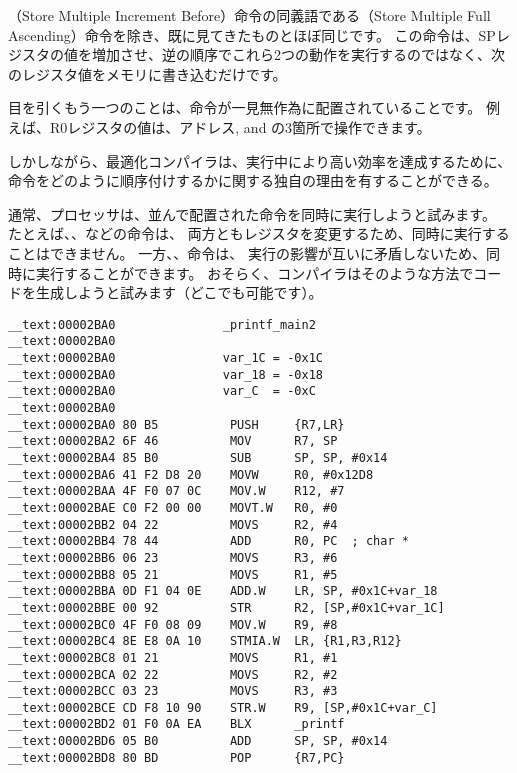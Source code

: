 （Store Multiple Increment Before）命令の同義語である（Store Multiple Full Ascending）命令を除き、既に見てきたものとほぼ同じです。
この命令は、\ac{SP}レジスタの値を増加させ、逆の順序でこれら2つの動作を実行するのではなく、次のレジスタ値をメモリに書き込むだけです。

目を引くもう一つのことは、命令が一見無作為に配置されていることです。
例えば、R0レジスタの値は、アドレス,  and の3箇所で操作できます。

しかしながら、最適化コンパイラは、実行中により高い効率を達成するために、命令をどのように順序付けするかに関する独自の理由を有することができる。

通常、プロセッサは、並んで配置された命令を同時に実行しようと試みます。
たとえば、、などの命令は、
両方ともレジスタを変更するため、同時に実行することはできません。
一方、、命令は、
実行の影響が互いに矛盾しないため、同時に実行することができます。
おそらく、コンパイラはそのような方法でコードを生成しようと試みます（どこでも可能です）。

\myparagraph{\OptimizingXcodeIV: \ThumbTwoMode}

\begin{lstlisting}[style=customasmARM]
__text:00002BA0               _printf_main2
__text:00002BA0
__text:00002BA0               var_1C = -0x1C
__text:00002BA0               var_18 = -0x18
__text:00002BA0               var_C  = -0xC
__text:00002BA0
__text:00002BA0 80 B5          PUSH     {R7,LR}
__text:00002BA2 6F 46          MOV      R7, SP
__text:00002BA4 85 B0          SUB      SP, SP, #0x14
__text:00002BA6 41 F2 D8 20    MOVW     R0, #0x12D8
__text:00002BAA 4F F0 07 0C    MOV.W    R12, #7
__text:00002BAE C0 F2 00 00    MOVT.W   R0, #0
__text:00002BB2 04 22          MOVS     R2, #4
__text:00002BB4 78 44          ADD      R0, PC  ; char *
__text:00002BB6 06 23          MOVS     R3, #6
__text:00002BB8 05 21          MOVS     R1, #5
__text:00002BBA 0D F1 04 0E    ADD.W    LR, SP, #0x1C+var_18
__text:00002BBE 00 92          STR      R2, [SP,#0x1C+var_1C]
__text:00002BC0 4F F0 08 09    MOV.W    R9, #8
__text:00002BC4 8E E8 0A 10    STMIA.W  LR, {R1,R3,R12}
__text:00002BC8 01 21          MOVS     R1, #1
__text:00002BCA 02 22          MOVS     R2, #2
__text:00002BCC 03 23          MOVS     R3, #3
__text:00002BCE CD F8 10 90    STR.W    R9, [SP,#0x1C+var_C]
__text:00002BD2 01 F0 0A EA    BLX      _printf
__text:00002BD6 05 B0          ADD      SP, SP, #0x14
__text:00002BD8 80 BD          POP      {R7,PC}
\end{lstlisting}

